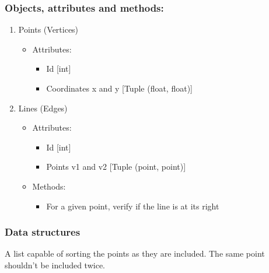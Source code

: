 \documentclass[twoside,12pt, a4paper]{memoir}
\begin{document}
\subsubsection{Objects, attributes and methods:}
\begin{enumerate}
  \item Points (Vertices)
        \begin{itemize}
          \item Attributes:
                \begin{itemize}
                  \item Id [int]
                  \item Coordinates x and y [Tuple (float, float)]
                \end{itemize}
        \end{itemize}
  \item Lines (Edges)
        \begin{itemize}
          \item Attributes:
                \begin{itemize}
                  \item Id [int]
                  \item Points v1 and v2 [Tuple (point, point)]
                \end{itemize}
          \item Methods:
               \begin{itemize}
                  \item For a given point, verify if the line is at its right
               \end{itemize}
        \end{itemize}
\end{enumerate}

\subsubsection{Data structures}
A list capable of sorting the points as they are included. The same point shouldn't be included twice.


\end{document}
